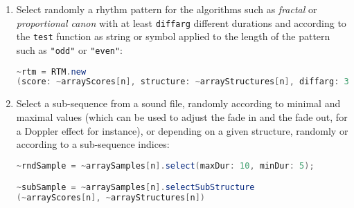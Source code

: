 \begin{enumerate}
    \item Select randomly a rhythm pattern for the algorithms such as \textsl{fractal} or \textsl{proportional canon} with at least \texttt{diffarg} different durations and according to the \texttt{test} function as string or symbol applied to the length of the pattern such as \texttt{"odd"} or \texttt{"even"}:
    
    \smallskip
    
\begin{lstlisting}[basicstyle=\footnotesize\ttfamily,language=Java]
~rtm = RTM.new
(score: ~arrayScores[n], structure: ~arrayStructures[n], diffarg: 3, test: \odd, limit: 10);	
\end{lstlisting}  
 \item Select a sub-sequence from a sound file, randomly according to minimal and maximal values (which can be used to adjust the fade in and the fade out, for a Doppler effect for instance), or depending on a given structure,  randomly or according to a sub-sequence indices:
 
 \smallskip
 
 \begin{lstlisting}[basicstyle=\footnotesize\ttfamily,language=Java]
~rndSample = ~arraySamples[n].select(maxDur: 10, minDur: 5);

~subSample = ~arraySamples[n].selectSubStructure
(~arrayScores[n], ~arrayStructures[n])
\end{lstlisting}  
\end{enumerate}
